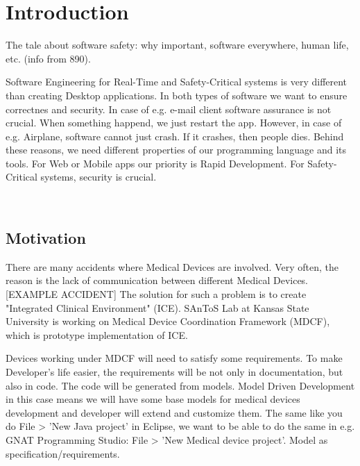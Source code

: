 
\cleardoublepage


\chapter{Introduction}
\label{introduction}

The tale about software safety: why important, software everywhere, human life, etc. (info from 890).

Software Engineering for Real-Time and Safety-Critical systems is very different than creating Desktop applications. In both types of software we want to ensure correctnes and security. In case of e.g. e-mail client software assurance is not crucial. When something happend, we just restart the app. However, in case of e.g. Airplane, software cannot just crash. If it crashes, then people dies. Behind these reasons, we need different properties of our programming language and its tools. For Web or Mobile apps our priority is Rapid Development. For Safety-Critical systems, security is crucial.

\

\section{Motivation}
\label{introduction:motivation}
There are many accidents where Medical Devices are involved. Very often, the reason is the lack of communication between different Medical Devices. [EXAMPLE ACCIDENT]
The solution for such a problem is to create "Integrated Clinical Environment" (ICE). SAnToS Lab at Kansas State University is working on Medical Device Coordination Framework (MDCF), which is prototype implementation of ICE.  

Devices working under MDCF will need to satisfy some requirements. To make Developer's life easier, the requirements will be not only in documentation, but also in code. The code will be generated from models.
Model Driven Development in this case means we will have some base models for medical devices development and developer will extend and customize them. The same like you do File > 'New Java project' in Eclipse, we want to be able to do the same in e.g. GNAT Programming Studio: File > 'New Medical device project'.
Model as specification/requirements.

